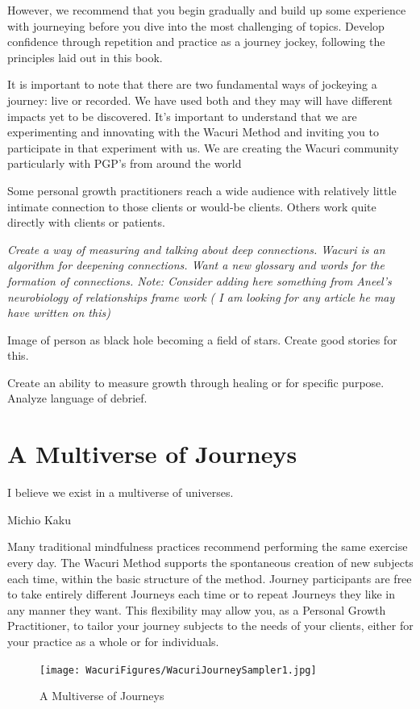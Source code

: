 \documentclass[12pt]{book}
\begin{document}
However, we recommend that you begin gradually and build up some
experience with journeying before you dive into the most challenging
of topics. Develop confidence through repetition and practice as a
journey jockey, following the principles laid out in this book.

It is important to note that there are two fundamental ways of
jockeying a journey: live or recorded. We have used both and they may
will have different impacts yet to be discovered. It's important to
understand that we are experimenting and innovating with the Wacuri
Method and inviting you to participate in that experiment with us. We
are creating the Wacuri community particularly with PGP’s from around
the world

Some personal growth practitioners reach a wide audience with
relatively little intimate connection to those clients or would-be
clients. Others work quite directly with clients or patients.

{\em
Create a way of measuring and talking about deep connections. Wacuri
is an algorithm for deepening connections. Want a new glossary and
words for the formation of connections. Note: Consider adding here
something from Aneel’s neurobiology of relationships frame work ( I am
looking for any article he may have written on this)
					
Image of person as black hole becoming a field of stars. Create good
stories for this.
					
Create an ability to measure growth through healing or for specific
purpose. Analyze language of debrief.
}

\chapter{ A Multiverse of Journeys}
\epigraph{I believe we exist in a multiverse of universes.}{Michio Kaku}

Many traditional mindfulness practices recommend performing the same
exercise every day. The Wacuri Method supports the spontaneous
creation of new subjects each time, within the basic structure of the
method. Journey participants are free to take entirely different
Journeys each time or to repeat Journeys they like in any manner they
want. This flexibility may allow you, as a Personal Growth
Practitioner, to tailor your journey subjects to the needs of your
clients, either for your practice as a whole or for individuals.

\begin{figure}
  \centering
     \texttt{[image: WacuriFigures/WacuriJourneySampler1.jpg]}
     \caption{A Multiverse of Journeys}
  \label{fig:journey}     
\end{figure}
					
\end{document}
